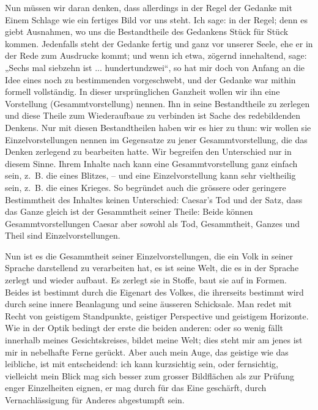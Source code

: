 \label{sp.325}

Nun müssen wir daran denken, dass allerdings in der Regel der Gedanke mit Einem Schlage wie ein fertiges Bild vor uns steht. Ich sage: in der Regel; denn es giebt Ausnahmen, wo uns die Bestandtheile des Gedankens Stück für Stück kommen. Jedenfalls steht der Gedanke fertig und ganz vor unserer Seele, ehe er in der Rede zum Ausdrucke kommt; und wenn ich etwa, zögernd innehaltend, sage: „Sechs mal siebzehn ist ... hundertundzwei“, so hat mir doch von Anfang an die Idee eines noch zu bestimmenden  vorgeschwebt, und der Gedanke war mithin formell vollständig. In dieser ursprünglichen Ganz\-\label{fp.317}heit wollen wir ihn eine Vorstellung (Gesammtvorstellung) nennen. Ihn in seine Bestandtheile zu zerlegen und diese Theile zum Wiederaufbaue zu verbinden ist Sache des redebildenden Denkens. Nur mit diesen Bestand\-theilen haben wir es hier zu thun: wir wollen sie Einzelvorstellungen nennen im Gegensatze zu jener Gesammtvorstellung, die das Denken zerlegend zu bearbeiten hatte. Wir begreifen den Unterschied  nur in diesem Sinne. Ihrem Inhalte nach kann eine Gesammtvorstellung ganz einfach sein, z.~B. die eines Blitzes, – und eine Einzelvorstellung kann sehr vieltheilig sein, z.~B. die eines Krieges. So begründet auch die grössere oder geringere Bestimmtheit des Inhaltes keinen Unterschied: Caesar’s Tod und der Satz, dass das Ganze gleich ist der Gesammtheit seiner Theile: Beide können Gesammtvorstellungen  Caesar aber sowohl als Tod, Gesammtheit, Ganzes und Theil sind Einzelvorstellungen.

Nun ist es die Gesammtheit seiner Einzelvorstellungen, die ein Volk in seiner Sprache darstellend zu verarbeiten hat, es ist seine Welt, die es in der Sprache zerlegt und wieder aufbaut. Es zerlegt sie in Stoffe, baut sie auf in Formen. Beides ist bestimmt durch die Eigenart des Volkes, die ihrerseits bestimmt wird durch seine innere Beanlagung und seine äusseren Schicksale. Man redet mit Recht von geistigem Standpunkte, geistiger  Perspective und geistigem Horizonte. Wie in der Optik bedingt der erste die beiden anderen:  oder so wenig fällt innerhalb meines Gesichtskreises, bildet meine Welt; dies steht mir am  jenes ist mir in nebelhafte Ferne gerückt. Aber auch mein Auge, das geistige wie das leibliche, ist mit entscheidend: ich kann kurzsichtig sein, oder fernsichtig, vielleicht  mein Blick mag sich besser zum  grosser Bildflächen als zur Prüfung enger Einzelheiten eignen, er mag durch  für das Eine geschärft, durch Vernachlässigung für Anderes abgestumpft sein.

